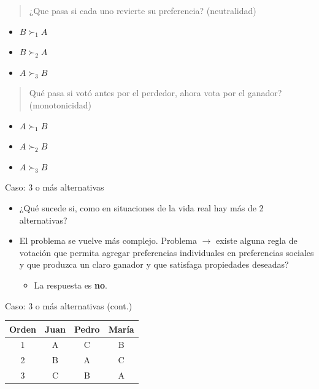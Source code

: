 \documentclass[
  ignorenonframetext,
]{beamer}
\providecommand{\tightlist}{%
  \setlength{\itemsep}{0pt}\setlength{\parskip}{0pt}}\usepackage{longtable,booktabs,array}
\begin{document}
\begin{frame}
\begin{quote}
¿Que pasa si cada uno revierte su preferencia? (neutralidad)
\end{quote}

\begin{itemize}
\tightlist
\item
  \(B \succ_{1} A\)
\item
  \(B \succ_{2}A\)
\item
  \(A \succ_{3} B\)
\end{itemize}

\begin{quote}
Qué pasa si votó antes por el perdedor, ahora vota por el ganador?
(monotonicidad)
\end{quote}

\begin{itemize}
\tightlist
\item
  \(A \succ_{1} B\)
\item
  \(A \succ_{2} B\)
\item
  \(A \succ_{3} B\)
\end{itemize}

\begin{block}{Caso: 3 o más alternativas}
\protect\hypertarget{caso-3-o-muxe1s-alternativas}{}
\begin{itemize}
\tightlist
\item
  ¿Qué sucede si, como en situaciones de la vida real hay más de 2
  alternativas?
\item
  El problema se vuelve más complejo. Problema \(\longrightarrow\)
  existe alguna regla de votación que permita agregar preferencias
  individuales en preferencias sociales y que produzca un claro ganador
  y que satisfaga propiedades deseadas?

  \begin{itemize}
  \tightlist
  \item
    La respuesta es \textbf{no}.
  \end{itemize}
\end{itemize}
\end{block}

\begin{block}{Caso: 3 o más alternativas (cont.)}
\protect\hypertarget{caso-3-o-muxe1s-alternativas-cont.}{}
\hypertarget{tab:tab1}{}
\begin{longtable}[]{@{}cccc@{}}
\toprule()
Orden & Juan & Pedro & María \\
\midrule()
\endhead
1 & A & C & B \\
2 & B & A & C \\
3 & C & B & A \\
\bottomrule()
\end{longtable}


\end{block}
\end{frame}
\end{document}
